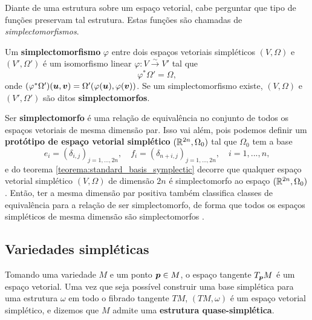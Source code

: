 Diante de uma estrutura sobre um espaço vetorial, cabe perguntar que tipo de funções preservam tal estrutura. Estas funções são chamadas de \textit{simplectomorfismos}.

\begin{definition}
    Um \textbf{simplectomorfismo} $\varphi$ entre dois espaços vetoriais simpléticos $(V, \Omega)$ e $(V', \Omega')$ é um isomorfismo linear $\varphi: V \xrightarrow{\sim} V'$ tal que
    \begin{equation*}
        \varphi^* \Omega' = \Omega, 
    \end{equation*}
    onde $(\varphi^* \Omega')(\bm u,\bm v) = \Omega'(\varphi(\bm u),\varphi(\bm v))$. Se um simplectomorfismo existe, $(V, \Omega)$ e $(V', \Omega')$ são ditos \textbf{simplectomorfos}.
\end{definition}

Ser \textbf{simplectomorfo} é uma relação de equivalência no conjunto de todos os espaços vetoriais de mesma dimensão par. Isso vai além, pois podemos definir um \textbf{protótipo de espaço vetorial simplético} $(\mathbb{R}^{2n}, \Omega_0)$ tal que $\Omega_0$ tem a base
\begin{equation*}
    e_i = (\delta_{i,j})_{j=1,...,2n},
    \quad
    f_i = (\delta_{n+i,j})_{j=1,...,2n},
    \quad
    i = 1, ..., n,
\end{equation*}
e do teorema \ref{teorema:standard_basis_symplectic} decorre que qualquer espaço vetorial simplético $(V, \Omega)$ de dimensão $2n$ é simplectomorfo ao espaço $(\mathbb{R}^{2n}, \Omega_0)$. Então, ter a mesma dimensão par positiva também classifica classes de equivalência para a relação de ser simplectomorfo, de forma que todos os espaços simpléticos de mesma dimensão são simplectomorfos \citep[6]{silva_lectures_2001}.


\subsection{Variedades simpléticas}

Tomando uma variedade $M$ e um ponto $\bm p \in M$, o espaço tangente $T_{\bm p} M$ é um espaço vetorial. Uma vez que seja possível construir uma base simplética para uma estrutura $\omega$ em todo o fibrado tangente $TM$, $(T M, \omega)$ é um espaço vetorial simplético, e dizemos que $M$ admite uma \textbf{estrutura quase-simplética}.

